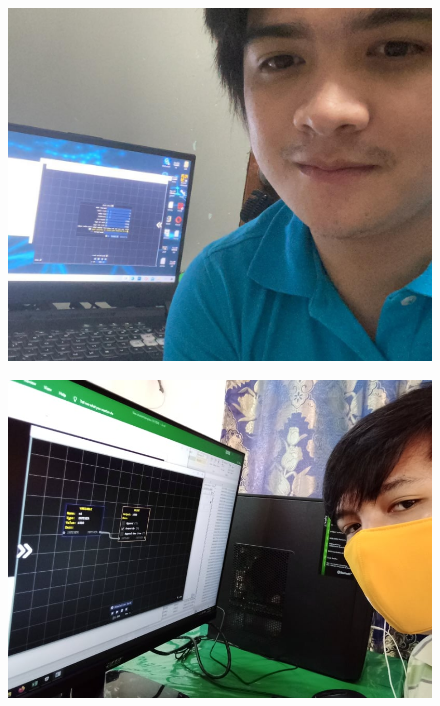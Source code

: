 \begin{figure}[H]
	 \centering
	 \includegraphics[width=\textwidth]{evaluators/tech/f_un2.jpg}
\end{figure}
\begin{figure}[H]
	 \centering
	 \includegraphics[width=\textwidth]{evaluators/tech/f_ls.jpg}
\end{figure}
